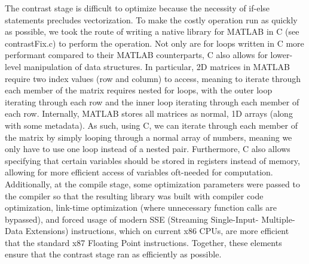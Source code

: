 The contrast stage is difficult to optimize because the necessity of if-else statements precludes 
vectorization. To make the costly operation run as quickly as possible, we took the route of 
writing a native library for MATLAB in C (see contrastFix.c) to perform the operation. Not only 
are for loops written in C more performant compared to their MATLAB counterparts, C also allows 
for lower-level manipulation of data structures. In particular, 2D matrices in MATLAB require 
two index values (row and column) to access, meaning to iterate through each member of the matrix 
requires nested for loops, with the outer loop iterating through each row and the inner loop 
iterating through each member of each row. Internally, MATLAB stores all matrices as normal, 1D 
arrays (along with some metadata). As such, using C, we can iterate through each member of the matrix 
by simply looping through a normal array of numbers, meaning we only have to use one loop instead 
of a nested pair. Furthermore, C also allows specifying that certain variables should be stored in 
registers instead of memory, allowing for more efficient access of variables oft-needed for computation. 
Additionally, at the compile stage, some optimization parameters were passed to the compiler so that 
the resulting library was built with compiler code optimization, link-time optimization (where 
unnecessary function calls are bypassed), and forced usage of modern SSE (Streaming Single-Input-
Multiple-Data Extensions) instructions, which on current x86 CPUs, are more efficient that the 
standard x87 Floating Point instructions. Together, these elements ensure that the contrast stage 
ran as efficiently as possible.